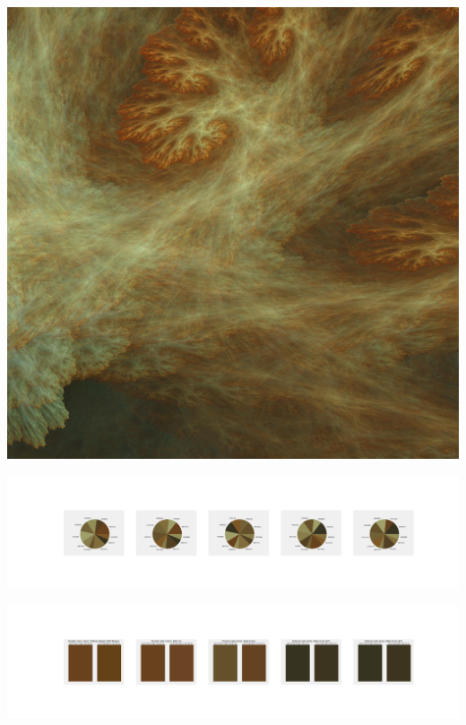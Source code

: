 \documentclass[11pt]{article}
\begin{document}
\begin{landscape}
    \begin{center}
    \includegraphics[width=\textwidth]{./nbimg/file (209).jpg}
    \end{center}

    \begin{center}
    \includegraphics[width=250mm]{./nbimg/pie-122.jpg}
    \end{center}

    \begin{center}
    \includegraphics[width=250mm]{./nbimg/peak-122.jpg}
    \end{center}
    


\end{landscape}
\end{document}
